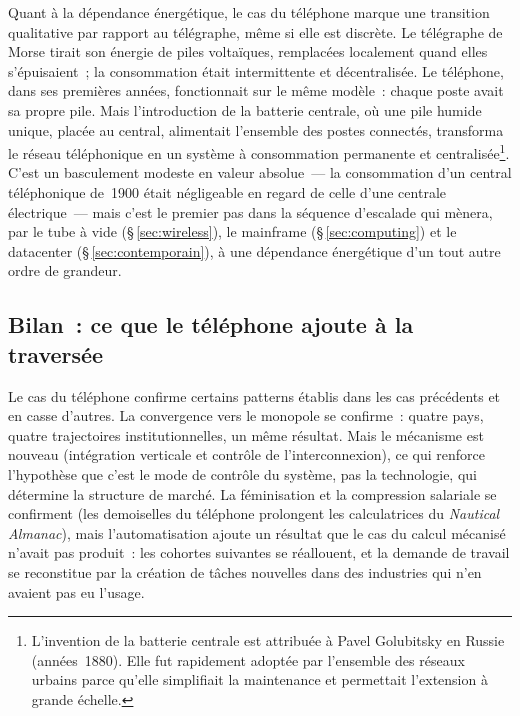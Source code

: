 %
Quant à la dépendance énergétique, le cas du téléphone marque une transition qualitative par rapport au télégraphe, même si elle est discrète. Le télégraphe de Morse tirait son énergie de piles voltaïques, remplacées localement quand elles s'épuisaient~; la consommation était intermittente et décentralisée. Le téléphone, dans ses premières années, fonctionnait sur le même modèle~: chaque poste avait sa propre pile. Mais l'introduction de la \og batterie centrale\fg{}, où une pile humide unique, placée au central, alimentait l'ensemble des postes connectés, transforma le réseau téléphonique en un système à consommation permanente et centralisée\footnote{L'invention de la batterie centrale est attribuée à Pavel Golubitsky en Russie (années~1880). Elle fut rapidement adoptée par l'ensemble des réseaux urbains parce qu'elle simplifiait la maintenance et permettait l'extension à grande échelle.}. C'est un basculement modeste en valeur absolue~--- la consommation d'un central téléphonique de~1900 était négligeable en regard de celle d'une centrale électrique~--- mais c'est le premier pas dans la séquence d'escalade qui mènera, par le tube à vide (§\,\ref{sec:wireless}), le mainframe (§\,\ref{sec:computing}) et le datacenter (§\,\ref{sec:contemporain}), à une dépendance énergétique d'un tout autre ordre de grandeur.


\subsection*{Bilan~: ce que le téléphone ajoute à la traversée}\label{subsec:bilan_telephone}

Le cas du téléphone confirme certains patterns établis dans les cas précédents et en casse d'autres. La convergence vers le monopole se confirme~: quatre pays, quatre trajectoires institutionnelles, un même résultat. Mais le mécanisme est nouveau (intégration verticale et contrôle de l'interconnexion), ce qui renforce l'hypothèse que c'est le mode de contrôle du système, pas la technologie, qui détermine la structure de marché. La féminisation et la compression salariale se confirment (les demoiselles du téléphone prolongent les calculatrices du \emph{Nautical Almanac}), mais l'automatisation ajoute un résultat que le cas du calcul mécanisé n'avait pas produit~: les cohortes suivantes se réallouent, et la demande de travail se reconstitue par la création de tâches nouvelles dans des industries qui n'en avaient pas eu l'usage.


